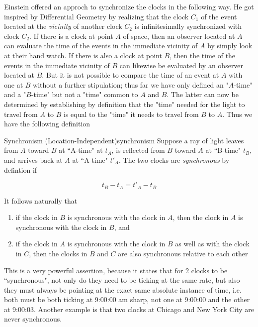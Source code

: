 Einstein offered an approch to synchronize the clocks in the following way. He got inspired by Differential Geometry
by realizing that the clock $C_1$ of the event located at the \textit{vicinity} of another clock $C_2$ is
infinitesimally synchronized with clock $C_2$. If there is a clock at point $A$ of space, then an observer located at
$A$ can evaluate the time of the events in the immediate vicinity of $A$ by simply look at their hand watch. If there is
also a clock at point $B$, then the time of the events in the immediate vicinity of $B$ can likewise be evaluated by an
observer located at $B$. But it is not possible to compare the time of an event at $A$ with one at $B$ without a further
stipulation; thus far we have only defined an "$A$-time" and a "$B$-time" but not a "time" common to $A$ and $B$. The
latter can now be determined by establishing by definition that the "time" needed for the light to travel from $A$ to
$B$ is equal to the "time" it needs to travel from $B$ to $A$. Thus we have the following definition

\begin{Definition}{Synchronism (Location-Independent)}{synchronism}
    Suppose a ray of light leaves from $A$ toward $B$ at ``A-time" at $t_A$, is reflected from $B$ toward $A$ at
    ``B-time" $t_B$, and arrives back at $A$ at ``A-time" $t'_A$. The two clocks are \textit{synchronous} by defintion
    if

    \begin{equation}\label{eq:synchronism}
    t_B - t_A = t'_A - t_B
    \end{equation}
\end{Definition}

It follows naturally that

\begin{enumerate}
    \item if the clock in $B$ is synchronous with the clock in $A$, then the clock in $A$ is synchronous with the clock
          in $B$, and
    \item if the clock in $A$ is synchronous with the clock in $B$ as well as with the clock in $C$, then the clocks in
          $B$ and $C$ are also synchronous relative to each other
\end{enumerate}

This is a very powerful assertion, because it states that for 2 clocks to be ``synchronous", not only do they need to
be ticking at the same rate, but also they must always be pointing at the exact same absolute instance of time, i.e.
both must be both ticking at 9:00:00 am sharp, not one at 9:00:00 and the other at 9:00:03. Another example is that
two clocks at Chicago and New York City are never synchronous.

